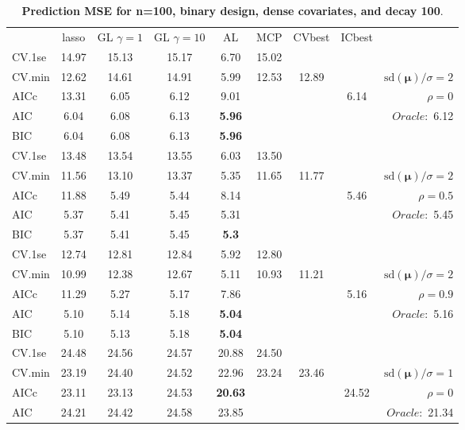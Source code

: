 \clearpage
\begin{table}\vspace{-.5cm}
\caption[l]{ { \bf Prediction MSE for n=100, binary design, 
dense covariates, and  decay  100}.}
\vspace{-.5cm}
\footnotesize{}
\begin{center}
\begin{tabular}{l*{7}{c}|r}
 & lasso & GL $\gamma=1$ & GL $\gamma=10$ & AL & MCP  & CVbest & ICbest  \\
\cline{1-9}
CV.1se & 14.97 & 15.13 & 15.17 & 6.70 & 15.02 & & & \\
CV.min & 12.62 & 14.61 & 14.91 & 5.99 & 12.53 & 12.89 & & $\mathrm{sd}(\mathbf{\mu})/\sigma=2$ \\
AICc & 13.31 & 6.05 & 6.12 & 9.01 & & & 6.14 &  $\rho=0$ \\
AIC & 6.04 & 6.08 & 6.13 & {\bf 5.96} & & & &  \multirow{2}{*}{$Oracle: $ 6.12} \\
BIC & 6.04 & 6.08 & 6.13 & {\bf 5.96} & & & &  \\
 \hline 
CV.1se & 13.48 & 13.54 & 13.55 & 6.03 & 13.50 & & & \\
CV.min & 11.56 & 13.10 & 13.37 & 5.35 & 11.65 & 11.77 & & $\mathrm{sd}(\mathbf{\mu})/\sigma=2$ \\
AICc & 11.88 & 5.49 & 5.44 & 8.14 & & & 5.46 &  $\rho=0.5$ \\
AIC & 5.37 & 5.41 & 5.45 & 5.31 & & & &  \multirow{2}{*}{$Oracle: $ 5.45} \\
BIC & 5.37 & 5.41 & 5.45 & {\bf 5.3} & & & &  \\
 \hline 
CV.1se & 12.74 & 12.81 & 12.84 & 5.92 & 12.80 & & & \\
CV.min & 10.99 & 12.38 & 12.67 & 5.11 & 10.93 & 11.21 & & $\mathrm{sd}(\mathbf{\mu})/\sigma=2$ \\
AICc & 11.29 & 5.27 & 5.17 & 7.86 & & & 5.16 &  $\rho=0.9$ \\
AIC & 5.10 & 5.14 & 5.18 & {\bf 5.04} & & & &  \multirow{2}{*}{$Oracle: $ 5.16} \\
BIC & 5.10 & 5.13 & 5.18 & {\bf 5.04} & & & &  \\
 \hline 
CV.1se & 24.48 & 24.56 & 24.57 & 20.88 & 24.50 & & & \\
CV.min & 23.19 & 24.40 & 24.52 & 22.96 & 23.24 & 23.46 & & $\mathrm{sd}(\mathbf{\mu})/\sigma=1$ \\
AICc & 23.11 & 23.13 & 24.53 & {\bf 20.63} & & & 24.52 &  $\rho=0$ \\
AIC & 24.21 & 24.42 & 24.58 & 23.85 & & & &  \multirow{2}{*}{$Oracle: $ 21.34} \\

\end{tabular}
\end{center}
\end{table}
